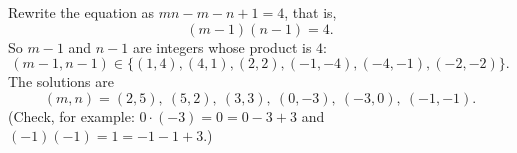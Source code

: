 Rewrite the equation as $mn-m-n+1=4$, that is,
\[(m-1)(n-1)=4.\]
So $m-1$ and $n-1$ are integers whose product is $4$:
\[(m-1,n-1)\in\{(1,4),(4,1),(2,2),(-1,-4),(-4,-1),(-2,-2)\}.\]
The solutions are
\[(m,n)=\boxed{(2,5),\ (5,2),\ (3,3),\ (0,-3),\ (-3,0),\ (-1,-1)}.\]
(Check, for example: $0\cdot(-3)=0=0-3+3$ and $(-1)(-1)=1=-1-1+3$.)
